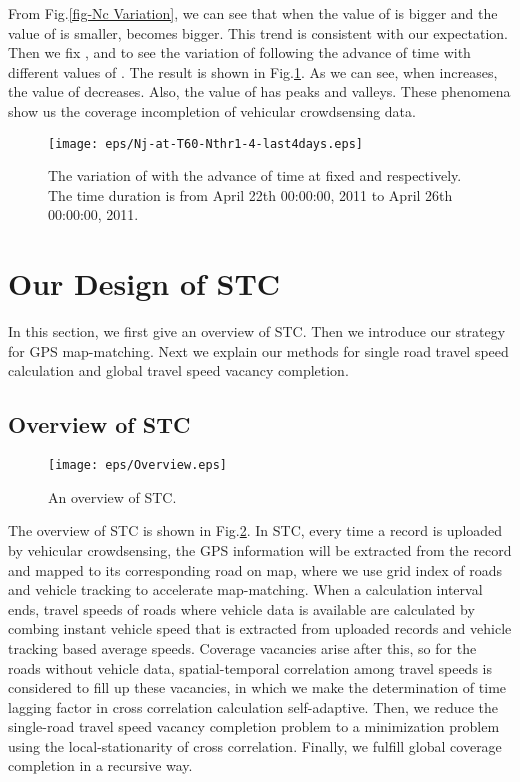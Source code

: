 \documentclass[twocolumn,10pt,final,conference]{IEEEtran}
\begin{document}
From Fig.\ref{fig-Nc Variation}, we can see that when the value of  is bigger and the value of  is smaller,  becomes bigger. This trend is consistent with our expectation.
Then we fix , and to see the variation of  following the advance of time with different values of . The result is shown in Fig.\ref{fig-Nj When Fix N_thr and T}. As we can see, when  increases, the value of  decreases. Also, the value of  has peaks and valleys. These phenomena show us the coverage incompletion of vehicular crowdsensing data.
\begin{figure}[h]
  \centering
\texttt{[image: eps/Nj-at-T60-Nthr1-4-last4days.eps]}
  \caption{The variation of  with the advance of time at fixed  and  respectively. The time duration is from April 22th 00:00:00, 2011 to April 26th 00:00:00, 2011.}
  \label{fig-Nj When Fix N_thr and T}
\end{figure}



\section{Our Design of STC}\label{section-STC}
In this section, we first give an overview of STC. Then we introduce our strategy for GPS map-matching. Next we explain our methods for single road travel speed calculation and global travel speed vacancy completion.
\subsection{Overview of STC}\label{section-Overview}
\begin{figure}[h]
  \centering
\texttt{[image: eps/Overview.eps]}
\caption{An overview of STC.}
  \label{fig-Overview of architecture}

\end{figure}
The overview of STC is shown in Fig.\ref{fig-Overview of architecture}.
In STC, every time a record is uploaded by vehicular crowdsensing, the GPS information will be extracted from the record and mapped to its corresponding road on map, where we use grid index of roads and vehicle tracking to accelerate map-matching.
When a calculation interval ends, travel speeds of roads where vehicle data is available are calculated by combing instant vehicle speed that is extracted from uploaded records and vehicle tracking based average speeds. Coverage vacancies arise after this, so for the roads without vehicle data, spatial-temporal correlation among travel speeds is considered to fill up these vacancies, in which we make the determination of time lagging factor in cross correlation calculation self-adaptive. Then, we reduce the single-road travel speed vacancy completion problem to a minimization problem using the local-stationarity of cross correlation. Finally, we fulfill global coverage completion in a recursive way.
\end{document}
